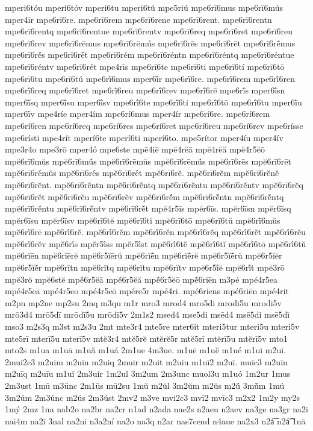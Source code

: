 {mperi6tóu
mperi6tóv
mperi6tu
mperi6tú
mpe5riú
mpe6rī6mus
mpe6rī6mús
mper4īr
mpe6rī6re.
mpe6rī6rem
mpe6rī6rene
mpe6rī6rent.
mpe6rī6rentn
mpe6rī6rentq
mpe6rī6rentue
mpe6rī6rentv
mpe6rī6req
mpe6rī6ret
mpe6rī6reu
mpe6rī6rev
mpe6rī6rēmus
mpe6rī6rēmús
mpe6rī6rēs
mpe6rī6rēt
mpe6rī6rḗmus
mpe6rī6rḗs
mpe6rī6rḗt
mpe6rī6rém
mpe6rī6réntn
mpe6rī6réntq
mpe6rī6réntue
mpe6rī6réntv
mpe6rī6rét
mpe4rīs
mpe6rī6te
mpe6rī6ti
mpe6rī6tí
mpe6rī6tō
mpe6rī6tu
mpe6rī6tú
mpe6rī́6mus
mper6ī́r
mpe6rī́6re.
mpe6rī́6rem
mpe6rī́6ren
mpe6rī́6req
mpe6rī́6ret
mpe6rī́6reu
mpe6rī́6rev
mpe6rī́6rē
mpe6rī́s
mper6ī́sn
mper6ī́sq
mper6ī́su
mper6ī́sv
mpe6rī́6te
mpe6rī́6ti
mpe6rī́6tō
mpe6rī́6tu
mper6ī́u
mper6ī́v
mpe4ríe
mper4ím
mpe6rí6mus
mper4ír
mpe6rí6re.
mpe6rí6rem
mpe6rí6ren
mpe6rí6req
mpe6rí6res
mpe6rí6ret
mpe6rí6reu
mpe6rí6rev
mpe6rísse
mpe6rísti
mpe4rít
mperí6te
mperí6ti
mperí6to.
mpe5rítor
mper4íu
mper4ív
mpe3r4o
mpe3rō
mper4ó
mpe6ste
mpē4iē
mpĕ4rĕā
mpĕ4rĕă
mpĕ4r5ĕō
mpĕ6rī6mŭs
mpĕ6rī6mŭ́s
mpĕ6rī6rēmŭs
mpĕ6rī6rēmŭ́s
mpĕ6rī6rēs
mpĕ6rī6rēt
mpĕ6rī6rḗmŭs
mpĕ6rī6rḗs
mpĕ6rī6rḗt
mpĕ6rī6rĕ.
mpĕ6rī6rĕm
mpĕ6rī6rĕnĕ
mpĕ6rī6rĕnt.
mpĕ6rī6rĕntn
mpĕ6rī6rĕntq
mpĕ6rī6rĕntu
mpĕ6rī6rĕntv
mpĕ6rī6rĕq
mpĕ6rī6rĕt
mpĕ6rī6rĕu
mpĕ6rī6rĕv
mpĕ6rī6rĕ́m
mpĕ6rī6rĕ́ntn
mpĕ6rī6rĕ́ntq
mpĕ6rī6rĕ́ntu
mpĕ6rī6rĕ́ntv
mpĕ6rī6rĕ́t
mpĕ4r5īs
mpĕr6īs.
mpĕr6īsn
mpĕr6īsq
mpĕr6īsu
mpĕr6īsv
mpĕ6rī6tĕ
mpĕ6rī6tĭ
mpĕ6rī6tō
mpĕ6rī6tŭ
mpĕ6rī́6mŭs
mpĕ6rī́6rē
mpĕ6rī́6rĕ.
mpĕ6rī́6rĕm
mpĕ6rī́6rĕn
mpĕ6rī́6rĕq
mpĕ6rī́6rĕt
mpĕ6rī́6rĕu
mpĕ6rī́6rĕv
mpĕ6rī́s
mpĕr5ī́ss
mpĕr5ī́st
mpĕ6rī́6tĕ
mpĕ6rī́6tĭ
mpĕ6rī́6tō
mpĕ6rī́6tŭ
mpĕ6rĭēn
mpĕ6rĭērĕ
mpĕ6r5ĭērŭ
mpĕ6rĭḗn
mpĕ6rĭḗrĕ
mpĕ6r5ĭḗrŭ
mpĕ6r5ĭĕr
mpĕ6r5ĭĕ́r
mpĕ6rĭtn
mpĕ6rĭtq
mpĕ6rĭtu
mpĕ6rĭtv
mpĕ6r5ĭ́ĕ
mpĕ6rĭ́t
mpĕ3rō
mpĕ3rŏ
mpĕ6stĕ
mpĕ́6r5ĕā
mpĕ́6r5ĕă
mpĕ́6r5ĕō
mpĕ́6rĭēn
m3pé
mpé4r5ea
mpé4r5eā
mpé4r5eo
mpé4r5eō
mpére5r
mpé4ri.
mpé6riens
mpé6riēn
mpé4rit
m2pn
mp2ne
mp2su
2mq
m3qu
m1r
mro3
mrod4
mro5di
mrodi5u
mrodi5v
mrō3d4
mrō5dī
mrōdī5u
mrōdī5v
2m1s2
msed4
mse5di
msēd4
msē5di
msē5dĭ
mso3
m2s3q
m3st
m2s3u
2mt
mte3r4
mte5re
mter6it
mteri5tur
mteri5u
mteri5v
mte5rī
mterī5u
mterī5v
mtĕ3r4
mtĕ5rĕ
mtĕrĕ5r
mtĕ5rī
mtĕrī5u
mtĕrī5v
mto1
mto2s
m1ua
m1uā
m1uă
m1uá
2m1ue
4m3ue.
m1uē
m1uĕ
m1ué
m1ui
m2ui.
2mui2c3
m2uim
m2uin
m2uiq
2muir
m2uit
m2uiu
m1uī2
m2uī.
muīc3
m2uīn
m2uīq
m2uīu
m1uĭ
2m3uír
1m2ul
3m2um
2m3unc
muol3u
m1uó
1m2ur
1mus
2m3ust
1mū
m3ūnc
2m1ūs
mū2su
1mŭ
m2ŭl
3m2ŭm
m2ŭs
m2ŭ́
3mŭ́m
1mú
3m2úm
2m3únc
m2ús
2m3úst
2mv2
m3ve
mvi2c3
mvī2
mvīc3
m2x2
1m2y
my2s
1mý
2mz
1na
nab2o
na2br
na2cr
n1ad
n2ada
nae2s
n2aeu
n2aev
na3ge
na3gr
na2i
nai4m
na2ī
3nal
na2ni
n3a2ní
na2o
na3q
n2ar
nas7cend
n4aue
na2x3
n2á͞
n2á͡
1nā
}

